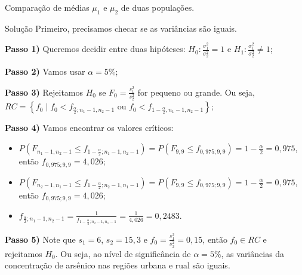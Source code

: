 \documentclass[9pt]{beamer}
\begin{document}
\begin{frame}{Comparação de médias $\mu_1$ e $\mu_2$ de duas populações.}
\small
\begin{block}{Solução}
	Primeiro, precisamos checar se as variâncias são iguais. 
	
	\textbf{Passo 1)} Queremos decidir entre duas hipóteses: $H_0: \frac{\sigma_1^2}{\sigma_2^2} = 1$ e $H_1: \frac{\sigma_1^2}{\sigma_2^2} \neq 1$;
	
	\textbf{Passo 2)} Vamos usar $\alpha=5\%$;
	
	\textbf{Passo 3)} Rejeitamos $H_0$ se $F_0 = \frac{s_1^2}{s_2^2}$ for pequeno ou grande. Ou seja, $RC = \left\{ f_0 \mid f_0 < f_{\frac{\alpha}{2}; n_1-1, n_2-1} \mbox{ ou } f_0 < f_{1-\frac{\alpha}{2}, n_1-1, n_2-1} \right\}$;
	
	\textbf{Passo 4)} Vamos encontrar os valores críticos:
	\begin{itemize}
		\item $P(F_{n_1-1, n_2-1} \leq f_{1-\frac{\alpha}{2}; n_1-1, n_2-1}) = P(F_{9, 9} \leq f_{0,975; 9, 9}) = 1-\frac{\alpha}{2} = 0,975$, então $f_{0,975; 9, 9}=4,026$;
		\item $P(F_{n_2-1, n_1-1} \leq f_{1-\frac{\alpha}{2}; n_2-1, n_1-1}) = P(F_{9, 9} \leq f_{0,975; 9, 9}) = 1-\frac{\alpha}{2} = 0,975$, então $f_{0,975; 9, 9}=4,026$;
		\item $f_{\frac{\alpha}{2}; n_1-1, n_2-1} = \frac{1}{f_{1-\frac{\alpha}{2}; n_2-1, n_1-1}}=\frac{1}{4,026}=0,2483$.
	\end{itemize}

	\textbf{Passo 5)} Note que $s_1 = 6$, $s_2=15,3$ e $f_0= \frac{s_1^2}{s_2^2} = 0,15$, então $f_0 \in RC$ e rejeitamos $H_0$. Ou seja, ao nível de significância de $\alpha=5\%$, as variâncias da concentração de arsênico nas regiões urbana e rual são iguais.
	
\end{block}
\normalsize
\end{frame}
\end{document}
